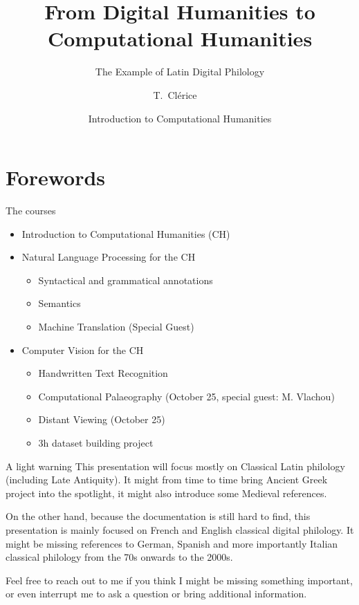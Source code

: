 \documentclass[aspectratio=169]{beamer}
\title[Intro to CH] %
{From Digital Humanities to Computational Humanities}\subtitle{The Example of Latin Digital Philology}
\author[Clérice, Thibault] %
{T.~Clérice~\inst{1}~\inst{2}}
\institute[Inria] %
{
  \inst{1}%
  ALMAnaCH, Inria, Paris, France \and
  \inst{2}%
  FeDHLab, Università Federico II, Napoli, Italia
 }
\date[2024] %
{Introduction to Computational Humanities}
\begin{document}
\frame{\titlepage}


\section{Forewords}

\begin{frame}{The courses}
    \begin{itemize}
        \item Introduction to Computational Humanities (CH)
        \item Natural Language Processing for the CH
        \begin{itemize}
            \item Syntactical and grammatical annotations
            \item Semantics
            \item Machine Translation (Special Guest)
        \end{itemize}
        \item Computer Vision for the CH
        \begin{itemize}
            \item Handwritten Text Recognition
            \item Computational Palaeography (October 25, special guest: M. Vlachou)
            \item Distant Viewing (October 25)
            \item 3h dataset building project
        \end{itemize}
    \end{itemize}
\end{frame}

\begin{frame}{A light warning}
    This presentation will focus mostly on Classical Latin philology (including Late Antiquity). It might from time to time bring Ancient Greek project into the spotlight, it might also introduce some Medieval references.

    On the other hand, because the documentation is still hard to find, this presentation is mainly focused on French and English classical digital philology. It might be missing references to German, Spanish and more importantly Italian classical philology from the 70s onwards to the 2000s. 
    
    Feel free to reach out to me if you think I might be missing something important, or even interrupt me to ask a question or bring additional information.
\end{frame}
\end{document}
